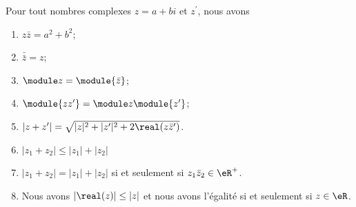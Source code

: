 \begin{proposition}     \label{PROPooUMVGooIrhZZg}
	Pour tout nombres complexes \( z = a+bi\) et \( z^\prime\), nous avons
	\begin{enumerate}
		\item       \label{ITEMooYBJVooGXiDSd}
		      \( z \bar z = a^2 + b^2\);
		\item       \label{ITEMooCGLSooKHbzkn}
		      \( \bar{\bar{z}} = z\);
		\item       \label{ITEMooDKWDooUjEuZA}
		      \( \module z = \module {\bar z}\);
		\item       \label{ITEMooFXKYooUOXbwH}
		      \( \module{zz^\prime} = \module z \module{z^\prime}\);
		\item     \label{ITEMooUJHPooUFdvqB}
		      \( | z+z' |=\sqrt{ | z |^2+| z' |^2+2\real(z\bar z') }\).
		\item       \label{ITEMooDVMDooFDmOur}
		      \( | z_1+z_2 |\leq | z_1 |+| z_2 |\)
		\item     \label{ITEMooHBIEooEhzlwI}
		      \( | z_1+z_2 |=| z_1 |+| z_2 |\) si et seulement si \( z_1\bar z_2\in \eR^+\).
		\item             \label{ITEMooMCAAooTuUxLV}
		      Nous avons \( | \real(z) |\leq | z |\) et nous avons l'égalité si et seulement si \( z\in \eR\).
	\end{enumerate}
\end{proposition}

